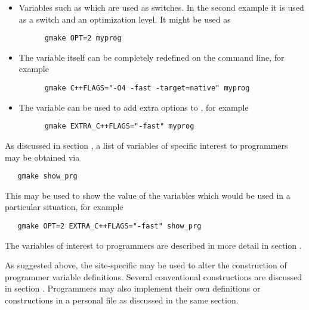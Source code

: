 \begin{itemize}
\item
   Variables such as  which are used as switches.  In the second
   example it is used as a switch and an optimization level.  It might be used
   as

   \begin{verbatim}
      gmake OPT=2 myprog
   \end{verbatim}

\item
   The  variable itself can be completely redefined on the
   command line, for example

   \begin{verbatim}
      gmake C++FLAGS="-O4 -fast -target=native" myprog
   \end{verbatim}

\item
   The  variable can be used to add extra options to
   , for example

   \begin{verbatim}
      gmake EXTRA_C++FLAGS="-fast" myprog
   \end{verbatim}

\end{itemize}

\noindent
As discussed in section , a list of variables
of specific interest to programmers may be obtained via

\begin{verbatim}
   gmake show_prg
\end{verbatim}

\noindent
This may be used to show the value of the variables which would be used in a
particular situation, for example

\begin{verbatim}
   gmake OPT=2 EXTRA_C++FLAGS="-fast" show_prg
\end{verbatim}

\noindent
The variables of interest to programmers are described in more detail in
section .

As suggested above, the site-specific  may be used to alter
the construction of programmer variable definitions.  Several conventional
constructions are discussed in section .  Programmers may also implement their own definitions or
constructions in a personal  file as discussed in the same
section.

